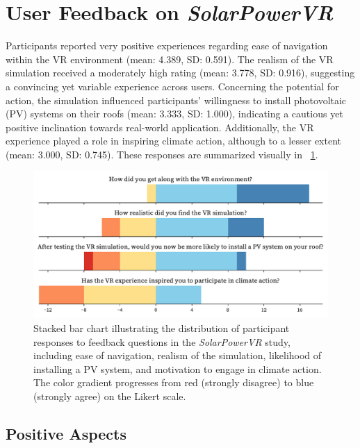 \documentclass[draft, final]{vutinfth} %
\begin{document}
\section{User Feedback on \textit{SolarPowerVR}}

Participants reported very positive experiences regarding ease of navigation within the VR environment (mean: 4.389, SD: 0.591).
The realism of the VR simulation received a moderately high rating (mean: 3.778, SD: 0.916), suggesting a convincing yet variable experience across users.
Concerning the potential for action, the simulation influenced participants' willingness to install photovoltaic (PV) systems on their roofs (mean: 3.333, SD: 1.000), indicating a cautious yet positive inclination towards real-world application.
Additionally, the VR experience played a role in inspiring climate action, although to a lesser extent (mean: 3.000, SD: 0.745).
These responses are summarized visually in \figurename~\ref{fig:feedback-solarpowervr}.

\begin{figure}[h]
    \centering
    \includegraphics[width=\textwidth]{graphics/feedback-solarpowervr.pdf}
    \caption{Stacked bar chart illustrating the distribution of participant responses to feedback questions in the \textit{SolarPowerVR} study, including ease of navigation, realism of the simulation, likelihood of installing a PV system, and motivation to engage in climate action. The color gradient progresses from red (strongly disagree) to blue (strongly agree) on the Likert scale.}
    \label{fig:feedback-solarpowervr}
\end{figure}

\subsection{Positive Aspects}
\end{document}
